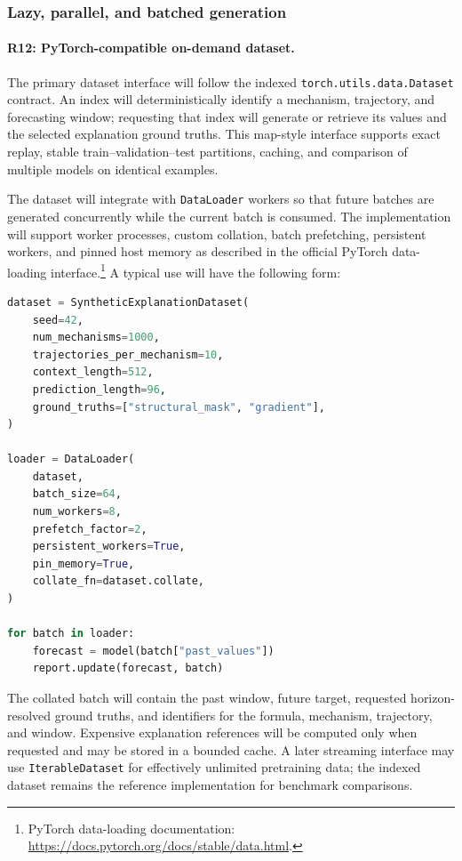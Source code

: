 \subsubsection{Lazy, parallel, and batched generation}

\paragraph{R12: PyTorch-compatible on-demand dataset.}
The primary dataset interface will follow the indexed
\texttt{torch.utils.data.Dataset} contract. An index will deterministically
identify a mechanism, trajectory, and forecasting window; requesting that
index will generate or retrieve its values and the selected explanation
ground truths. This map-style interface supports exact replay, stable
train--validation--test partitions, caching, and comparison of multiple models
on identical examples.

The dataset will integrate with \texttt{DataLoader} workers so that future
batches are generated concurrently while the current batch is consumed. The
implementation will support worker processes, custom collation, batch
prefetching, persistent workers, and pinned host memory as described in the
official PyTorch data-loading interface.\footnote{PyTorch data-loading
documentation: \url{https://docs.pytorch.org/docs/stable/data.html}.}
A typical use will have the following form:

\begin{lstlisting}[language=Python,caption={Required lazy and parallel batch-generation interface.}]
dataset = SyntheticExplanationDataset(
    seed=42,
    num_mechanisms=1000,
    trajectories_per_mechanism=10,
    context_length=512,
    prediction_length=96,
    ground_truths=["structural_mask", "gradient"],
)

loader = DataLoader(
    dataset,
    batch_size=64,
    num_workers=8,
    prefetch_factor=2,
    persistent_workers=True,
    pin_memory=True,
    collate_fn=dataset.collate,
)

for batch in loader:
    forecast = model(batch["past_values"])
    report.update(forecast, batch)
\end{lstlisting}

The collated batch will contain the past window, future target, requested
horizon-resolved ground truths, and identifiers for the formula, mechanism,
trajectory, and window. Expensive explanation references will be computed only
when requested and may be stored in a bounded cache. A later streaming
interface may use \texttt{IterableDataset} for effectively unlimited
pretraining data; the indexed dataset remains the reference implementation for
benchmark comparisons.

